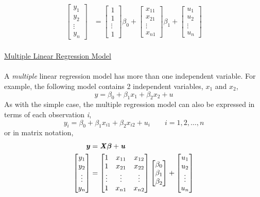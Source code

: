 \documentclass[12pt]{report}
\newenvironment{blueframed}[1][blue]
{\def\FrameCommand{\fboxsep=\FrameSep\fcolorbox{#1}{white}}%
\MakeFramed {\advance\hsize-\width \FrameRestore}}
{\endMakeFramed}
\begin{document}
\begin{blueframed}
{\begin{align*}
	\begin{bmatrix}
	y_{1} \\
	y_{2} \\
	\vdots \\
	y_{n} 
	\end{bmatrix}
	&= 
	\begin{bmatrix}
	1 \\
	1 \\
	\vdots \\
	1   
	\end{bmatrix}
	\beta_0
	+
	\begin{bmatrix}
	x_{11} \\
	x_{21} \\
	\vdots \\
	x_{n1}   
	\end{bmatrix}
	\beta_1
	+
	\begin{bmatrix}
	u_{1} \\
	u_{2} \\
	\vdots \\
	u_{n} 
	\end{bmatrix}
	\end{align*}\\
	\uline{Multiple Linear Regression Model} \\ \\
	A \textit{multiple} linear regression model has more than one independent variable. For example, the following model contains 2 independent variables, $x_1$ and $x_2$,
	$$y = \beta_0+\beta_1x_{1}+\beta_2x_{2}+u$$
	As with the simple case, the multiple regression model can also be expressed in terms of each observation \textit{i},
	$$y_i = \beta_0+\beta_1x_{i1}+\beta_2x_{i2}+u_i \qquad i=1,2,\dots,n$$
	or in matrix notation,
	\begin{align*}
	\textbf{\textit{y}}&=\textbf{\textit{X}}\boldsymbol{\beta}+\textbf{\textit{u}} \\
	\begin{bmatrix}
	y_{1} \\
	y_{2} \\
	\vdots \\
	y_{n} 
	\end{bmatrix}
	&=
	\begin{bmatrix}
	1 & x_{11} & x_{12} \\
	1 & x_{21} & x_{22} \\
	\vdots & \vdots & \vdots \\
	1 & x_{n1} & x_{n2}  
	\end{bmatrix}
	\begin{bmatrix}
	\beta_0 \\
	\beta_1 \\
	\beta_2
	\end{bmatrix}
	+
	\begin{bmatrix}
	u_{1} \\
	u_{2} \\
	\vdots \\
	u_{n} 
	\end{bmatrix} \\
	\end{align*}
}
\end{blueframed}
\end{document}

